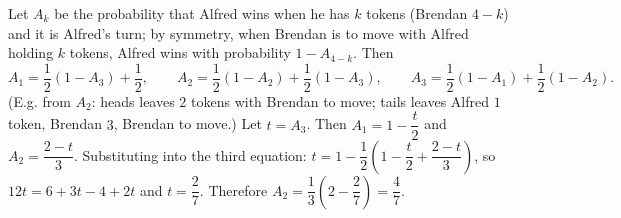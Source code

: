 Let $A_k$ be the probability that Alfred wins when he has $k$ tokens (Brendan $4-k$) and it is Alfred's turn; by symmetry, when Brendan is to move with Alfred holding $k$ tokens, Alfred wins with probability $1-A_{4-k}$. Then
\[A_1=\dfrac12(1-A_3)+\dfrac12,\qquad A_2=\dfrac12(1-A_2)+\dfrac12(1-A_3),\qquad A_3=\dfrac12(1-A_1)+\dfrac12(1-A_2).\]
(E.g. from $A_2$: heads leaves $2$ tokens with Brendan to move; tails leaves Alfred $1$ token, Brendan $3$, Brendan to move.) Let $t=A_3$. Then $A_1=1-\dfrac t2$ and $A_2=\dfrac{2-t}3$. Substituting into the third equation: $t=1-\dfrac12\left(1-\dfrac t2+\dfrac{2-t}3\right)$, so $12t=6+3t-4+2t$ and $t=\dfrac27$. Therefore $A_2=\dfrac13\left(2-\dfrac27\right)=\boxed{\dfrac47}$.
